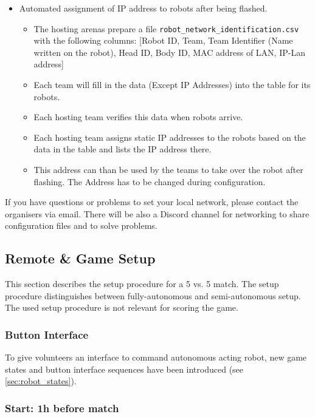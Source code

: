 \begin{itemize}
\begin{itemize}
    \end{itemize}
    \item Automated assignment of IP address to robots after being flashed.
    \begin{itemize}
        \item \label{sec:robot_table} The hosting arenas prepare a file \texttt{robot\_network\_identification.csv} with the following columns: [Robot ID, Team, Team Identifier (Name written on the robot), Head ID, Body ID, MAC address of LAN, IP-Lan address]
        \item Each team will fill in the data (Except IP Addresses) into the table for its robots.
        \item Each hosting team verifies this data when robots arrive.
        \item Each hosting team assigns static IP addresses to the robots based on the data in the table and lists the IP address there.
        \item This address can than be used by the teams to take over the robot after flashing. The Address has to be changed during configuration.
    \end{itemize}
\end{itemize}

If you have questions or problems to set your local network, please contact the organisers via email. There will be also a Discord channel for networking to share configuration files and to solve problems.

\subsection{Remote \& Game Setup}
\label{sec:remote_game_setup}
This section describes the setup procedure for a 5 vs. 5 match. The setup procedure distinguishes between fully-autonomous and semi-autonomous setup. The used setup procedure is not relevant for scoring the game.

\subsubsection{Button Interface}
To give volunteers an interface to command autonomous acting robot, new game states and button interface sequences have been introduced (see \ref{sec:robot_states}).

\subsubsection{Start: 1h before match}
\label{sec:setup_two_hours}

